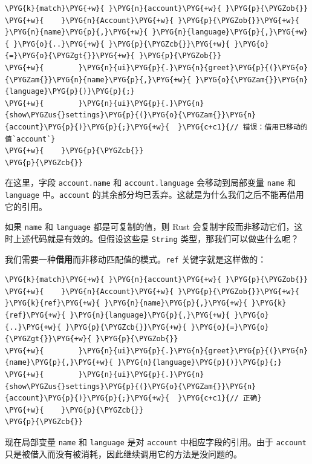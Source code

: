 \begin{Verbatim}[commandchars=\\\{\},breaklines=true,breakanywhere=true,fontsize=\codefont,xleftmargin=17bp]
\PYG{k}{match}\PYG{+w}{ }\PYG{n}{account}\PYG{+w}{ }\PYG{p}{\PYGZob{}}
\PYG{+w}{    }\PYG{n}{Account}\PYG{+w}{ }\PYG{p}{\PYGZob{}}\PYG{+w}{ }\PYG{n}{name}\PYG{p}{,}\PYG{+w}{ }\PYG{n}{language}\PYG{p}{,}\PYG{+w}{ }\PYG{o}{..}\PYG{+w}{ }\PYG{p}{\PYGZcb{}}\PYG{+w}{ }\PYG{o}{=}\PYG{o}{\PYGZgt{}}\PYG{+w}{ }\PYG{p}{\PYGZob{}}
\PYG{+w}{        }\PYG{n}{ui}\PYG{p}{.}\PYG{n}{greet}\PYG{p}{(}\PYG{o}{\PYGZam{}}\PYG{n}{name}\PYG{p}{,}\PYG{+w}{ }\PYG{o}{\PYGZam{}}\PYG{n}{language}\PYG{p}{)}\PYG{p}{;}
\PYG{+w}{        }\PYG{n}{ui}\PYG{p}{.}\PYG{n}{show\PYGZus{}settings}\PYG{p}{(}\PYG{o}{\PYGZam{}}\PYG{n}{account}\PYG{p}{)}\PYG{p}{;}\PYG{+w}{  }\PYG{c+c1}{// 错误：借用已移动的值`account`}
\PYG{+w}{    }\PYG{p}{\PYGZcb{}}
\PYG{p}{\PYGZcb{}}
\end{Verbatim}

在这里，字段 \texttt{account.name} 和 \texttt{account.language} 会移动到局部变量 \texttt{name} 和 \texttt{language} 中。\texttt{account} 的其余部分均已丢弃。这就是为什么我们之后不能再借用它的引用。

如果 \texttt{name} 和 \texttt{language} 都是可复制的值，则 Rust 会复制字段而非移动它们，这时上述代码就是有效的。但假设这些是 \texttt{String} 类型，那我们可以做些什么呢？

我们需要一种\textbf{借用}而非移动匹配值的模式。\texttt{ref} 关键字就是这样做的：

\begin{Verbatim}[commandchars=\\\{\},breaklines=true,breakanywhere=true,fontsize=\codefont,xleftmargin=17bp]
\PYG{k}{match}\PYG{+w}{ }\PYG{n}{account}\PYG{+w}{ }\PYG{p}{\PYGZob{}}
\PYG{+w}{    }\PYG{n}{Account}\PYG{+w}{ }\PYG{p}{\PYGZob{}}\PYG{+w}{ }\PYG{k}{ref}\PYG{+w}{ }\PYG{n}{name}\PYG{p}{,}\PYG{+w}{ }\PYG{k}{ref}\PYG{+w}{ }\PYG{n}{language}\PYG{p}{,}\PYG{+w}{ }\PYG{o}{..}\PYG{+w}{ }\PYG{p}{\PYGZcb{}}\PYG{+w}{ }\PYG{o}{=}\PYG{o}{\PYGZgt{}}\PYG{+w}{ }\PYG{p}{\PYGZob{}}
\PYG{+w}{        }\PYG{n}{ui}\PYG{p}{.}\PYG{n}{greet}\PYG{p}{(}\PYG{n}{name}\PYG{p}{,}\PYG{+w}{ }\PYG{n}{language}\PYG{p}{)}\PYG{p}{;}
\PYG{+w}{        }\PYG{n}{ui}\PYG{p}{.}\PYG{n}{show\PYGZus{}settings}\PYG{p}{(}\PYG{o}{\PYGZam{}}\PYG{n}{account}\PYG{p}{)}\PYG{p}{;}\PYG{+w}{  }\PYG{c+c1}{// 正确}
\PYG{+w}{    }\PYG{p}{\PYGZcb{}}
\PYG{p}{\PYGZcb{}}
\end{Verbatim}

现在局部变量 \texttt{name} 和 \texttt{language} 是对 \texttt{account} 中相应字段的引用。由于 \texttt{account} 只是被借入而没有被消耗，因此继续调用它的方法是没问题的。

